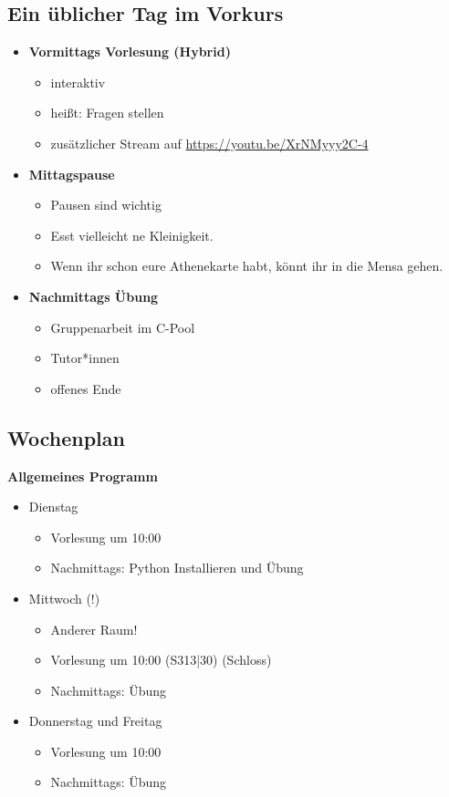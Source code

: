 \subsection{Ein üblicher Tag im Vorkurs}
\begin{frame}
	\slidehead
	\begin{itemize}
		\item \textbf{Vormittags Vorlesung (Hybrid)}
		\begin{itemize}
			\item interaktiv
			\item heißt: Fragen stellen
			\item zusätzlicher Stream auf \href{https://youtu.be/XrNMyyy2C-4}{https://youtu.be/XrNMyyy2C-4}
		\end{itemize}
		\pause
		\item \textbf{Mittagspause}
		\begin{itemize}
			\item Pausen sind wichtig
			\item Esst vielleicht ne Kleinigkeit.
			\item Wenn ihr schon eure Athenekarte habt, könnt ihr in die Mensa gehen.
		\end{itemize}
		\pause
		\item \textbf{Nachmittags Übung}
		\begin{itemize}
			\item Gruppenarbeit im C-Pool
			\item Tutor*innen
			\item offenes Ende
		\end{itemize}
	\end{itemize}
\end{frame}

\subsection{Wochenplan}
\begin{frame}
	\slidehead
	\textbf{Allgemeines Programm}
	\begin{itemize}
		\item Dienstag
		\begin{itemize}
			\item Vorlesung um 10:00
			\item Nachmittags: Python Installieren und Übung
		\end{itemize}
		\pause
		\item Mittwoch (!)
		\begin{itemize}
			\item Anderer Raum!
			\item Vorlesung um 10:00 (S313|30) (Schloss)
			\item Nachmittags: Übung
		\end{itemize}
		\pause
		\item Donnerstag und Freitag
		\begin{itemize}
			\item Vorlesung um 10:00
			\item Nachmittags: Übung
		\end{itemize}
	\end{itemize}
\end{frame}

